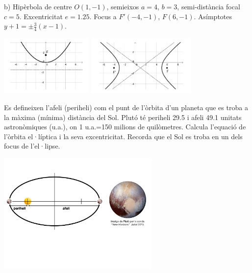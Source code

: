 \begin{mylist}
{	b) Hipèrbola de centre $O(1,-1)$, semieixos $a=4$, $b=3$, semi-distància focal $c=5$. Excentricitat $e=1.25$. Focus a $F'(-4,-1)$, $F(6,-1)$. Asímptotes $y+1=\pm\frac{3}{4}(x-1)$.
	
	\begin{center}
		\includegraphics[height=3cm]{img-10-bloc3/bloc3-sol-14a}
		\includegraphics[height=3cm]{img-10-bloc3/bloc3-sol-14b}
	\end{center}
}

\exer[2] Es defineixen l'afeli (periheli) com el punt de l'òrbita d'un planeta que es troba a la màxima (mínima) distància del Sol. Plutó té periheli 29.5 i afeli 49.1 unitats astronòmiques (u.a.), on 1 u.a.=150 milions de quilòmetres. Calcula l'equació de l'òrbita el·líptica i la seva excentricitat. Recorda que el Sol es troba en un dels focus de l'el·lipse.

\begin{center}
	\includegraphics[width=0.6\textwidth]{img-10-bloc3/pluton}
\end{center}

	
\end{mylist}
